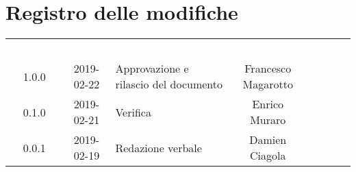 \section*{Registro delle modifiche}
{
	\renewcommand{\arraystretch}{1.5}
	\centering
	\begin{longtable}{ c c  C{4cm}  c  c }
		
		\textcolor{white}{\textbf{Versione}} & \textcolor{white}{\textbf{Data}} & \textcolor{white}{\textbf{Descrizione}} & \textcolor{white}{\textbf{Autore}} & \textcolor{white}{\textbf{Ruolo}}\\
		1.0.0 & 2019-02-22 & Approvazione e rilascio del documento & Francesco Magarotto & \Res{} \\
		0.1.0 & 2019-02-21 & Verifica & Enrico Muraro & \ver{}\\
		0.0.1 & 2019-02-19 & Redazione verbale & Damien Ciagola & \reda{}\\
		
		
	\end{longtable}
	
}